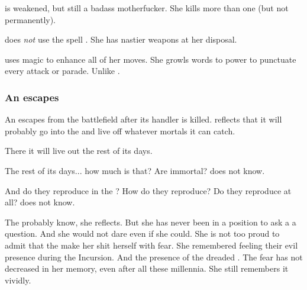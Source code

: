 \begin{garbage}

\Nzessuacrith{} is weakened, but still a badass motherfucker. 
She kills more than one \resphan{} (but not permanently). 

\Nzessuacrith{} does \emph{not} use the spell . 
She has nastier weapons at her disposal. 

\Nzessuacrith{} uses magic to enhance all of her moves. 
She growls words to power to punctuate every attack or parade. 
Unlike \Ishnaruchaefir. 





\subsubsection{An \umbra{} escapes}
An \umbra{} escapes from the battlefield after its handler is killed. 
\Achsah{} reflects that it will probably go into the \Wylde{} and live off whatever mortals it can catch. 

There it will live out the rest of its days. 

The rest of its days... how much is that? 
Are \umbrae{} immortal? 
\Achsah{} does not know. 

And do they reproduce in the \Wylde{}?
How do they reproduce? 
Do they reproduce at all? 
\Achsah{} does not know. 

The \banelords{} probably know, she reflects. 
But she has never been in a position to ask a \banelord{} a question. 
And she would not dare even if she could. 
She is not too proud to admit that the \banelords{} make her shit herself with fear. 
She remembered feeling their evil presence during the Incursion. 
And the presence of the dreaded \Voidbringer. 
The fear has not decreased in her memory, even after all these millennia. 
She still remembers it vividly. 


\end{garbage}
